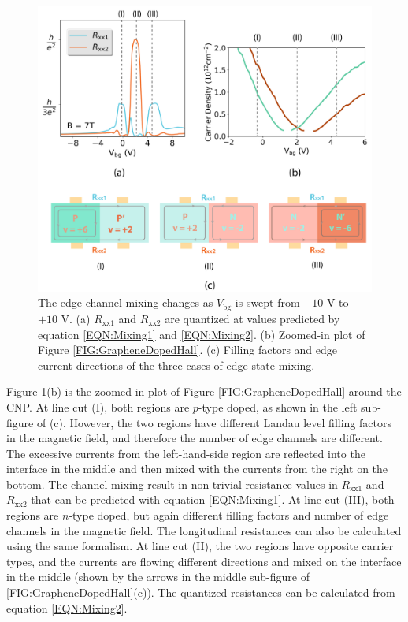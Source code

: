\documentclass[pdflatex, sectionletters, 12pt]{pittetd}    %
\begin{document}
\begin{figure}[p]
	\centering
	\includegraphics[width=1.0\textwidth]{Drawing/EdgeChannels.pdf}
	\caption{The edge channel mixing changes as $V_\mathrm{bg}$ is swept from $-10$ V to $+10$ V. (a) $R_\mathrm{xx1}$ and $R_\mathrm{xx2}$ are quantized at values predicted by equation \ref{EQN:Mixing1} and \ref{EQN:Mixing2}. (b) Zoomed-in plot of Figure \ref{FIG:GrapheneDopedHall}. (c) Filling factors and edge current directions of the three cases of edge state mixing.}
	\label{FIG:EdgeChannels}
\end{figure}

Figure \ref{FIG:EdgeChannels}(b) is the zoomed-in plot of Figure \ref{FIG:GrapheneDopedHall} around the CNP. At line cut (I), both regions are $p$-type doped, as shown in the left sub-figure of (c). However, the two regions have different Landau level filling factors in the magnetic field, and therefore the number of edge channels are different. The excessive currents from the left-hand-side region are reflected into the interface in the middle and then mixed with the currents from the right on the bottom. The channel mixing result in non-trivial resistance values in $R_\mathrm{xx1}$ and $R_\mathrm{xx2}$ that can be predicted with equation \ref{EQN:Mixing1}. At line cut (III), both regions are $n$-type doped, but again different filling factors and number of edge channels in the magnetic field. The longitudinal resistances can also be calculated using the same formalism. At line cut (II), the two regions have opposite carrier types, and the currents are flowing different directions and mixed on the interface in the middle (shown by the arrows in the middle sub-figure of \ref{FIG:GrapheneDopedHall}(c)). The quantized resistances can be calculated from equation \ref{EQN:Mixing2}.
\end{document}
